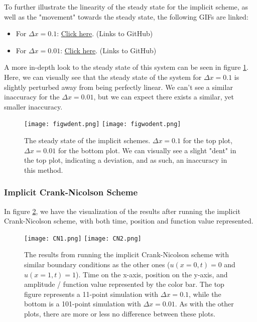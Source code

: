 \documentclass[reprint,english,notitlepage]{revtex4-1}  %
\begin{document}
\newpage

To further illustrate the linearity of the steady state for the implicit scheme, as well as the "movement" towards the steady state, the following GIFs are linked:
\begin{itemize}
    \item For $\Delta x = 0.1$: \href{https://github.com/Jan-Egil/FYS3150/blob/master/Project5/Project5/GIF/impdelx10.gif}{Click here}. (Links to GitHub)
    \item For $\Delta x = 0.01$: \href{https://github.com/Jan-Egil/FYS3150/blob/master/Project5/Project5/GIF/impdelx100.gif}{Click here}. (Links to GitHub)
\end{itemize}

A more in-depth look to the steady state of this system can be seen in figure \ref{fig:1Dimplicitsteady}. Here, we can visually see that the steady state of the system for $\Delta x = 0.1$ is slightly perturbed away from being perfectly linear. We can't see a similar inaccuracy for the $\Delta x = 0.01$, but we can expect there exists a similar, yet smaller inaccuracy.

\begin{figure}[h!]
    \centering
    \texttt{[image: figwdent.png]}
    \texttt{[image: figwodent.png]}    
    \caption{The steady state of the implicit schemes. $\Delta x = 0.1$ for the top plot, $\Delta x = 0.01$ for the bottom plot. We can visually see a slight "dent" in the top plot, indicating a deviation, and as such, an inaccuracy in this method. }
    \label{fig:1Dimplicitsteady}
\end{figure}

\newpage

\subsubsection{Implicit Crank-Nicolson Scheme}

In figure \ref{fig:CN1DWORKS}, we have the visualization of the results after running the implicit Crank-Nicolson scheme, with both time, position and function value represented.
\begin{figure}[h!]
    \centering
    \texttt{[image: CN1.png]}
    \texttt{[image: CN2.png]}    
    \caption{The results from running the implicit Crank-Nicolson scheme with similar boundary conditions as the other ones ($u(x=0,t) = 0$ and $u(x=1,t) = 1$). Time on the x-axis, position on the y-axis, and amplitude / function value represented by the color bar. The top figure represents a 11-point simulation with $\Delta x = 0.1$, while the bottom is a 101-point simulation with $\Delta x = 0.01$. As with the other plots, there are more or less no difference between these plots.}
    \label{fig:CN1DWORKS}
\end{figure}
\end{document}
